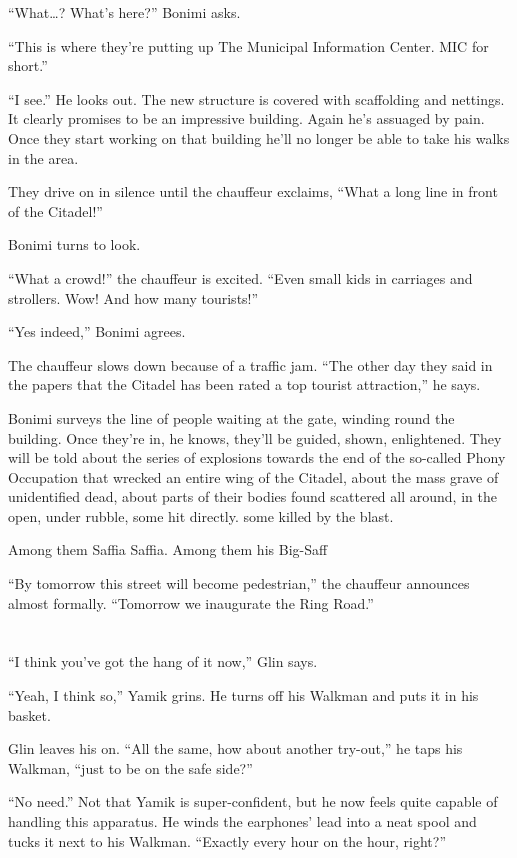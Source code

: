 \documentclass[twoside,11pt]{book}
\begin{document}
``What{\ldots}? What's here?'' Bonimi asks.

``This is where they're putting up The Municipal Information Center. MIC for short.''

``I see.'' He looks out. The new structure is covered with scaffolding and nettings.
It{ }clearly promises to be an impressive building. Again he's assuaged by pain. Once they start
working on that building he'll no longer be able to take his walks in the area.

They drive on in silence until the chauffeur exclaims, ``What a long line in front of the
Citadel!''

Bonimi turns to look.

``What a crowd!'' the chauffeur is excited. ``Even small kids in carriages and
strollers. Wow! And how many tourists!''

``Yes indeed,'' Bonimi agrees.

The chauffeur slows down because of a traffic jam. ``The other day they said in the papers that the
Citadel has been rated a top tourist attraction,'' he says.

Bonimi surveys the line of people waiting at the gate, winding round the building. Once they're in, he knows, they'll be
guided, shown, enlightened. They will be told about the series of explosions towards the end of the so-called Phony
Occupation that wrecked an entire wing of the Citadel, about the mass grave of unidentified dead, about parts of their
bodies found scattered all around, in the open, under rubble, some hit directly. some killed by the blast.

Among them Saffia Saffia. Among them his Big-Saff

``By tomorrow this street will become pedestrian,'' the chauffeur announces almost formally.
``Tomorrow we inaugurate the Ring Road.''


\chapter{}

``I think you've got the hang of it now,'' Glin says.

``Yeah, I think so,'' Yamik grins. He turns off his Walkman and puts it in his basket.

Glin leaves his on. ``All the same, how about another try-out,'' he taps his Walkman, ``just
to be on the safe side?''

``No need.'' Not that Yamik is super-confident, but he now feels quite capable of handling
this apparatus. He winds the earphones{'} lead into a neat spool and tucks it next to his Walkman. ``Exactly
every hour on the hour, right?''
\end{document}
